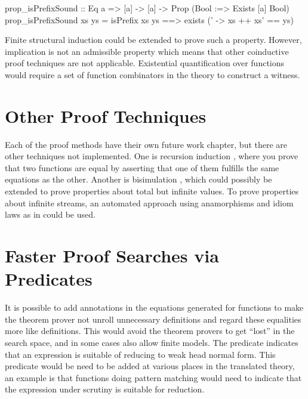 \begin{code}
prop_isPrefixSound :: Eq a => [a] -> [a] -> Prop (Bool :=> Exists [a] Bool)
prop_isPrefixSound xs ys = isPrefix xs ys ==> exists (\xs' -> xs ++ xs' == ys)
\end{code}

Finite structural induction could be extended to prove such a
property. However, implication is not an admissible property which
means that other coinductive proof techniques are not
applicable. Existential quantification over functions would require a
set of function combinators in the theory to construct a witness.

\section{Other Proof Techniques}

Each of the proof methods have their own future work chapter, but
there are other techniques not implemented. One is recursion induction
\citep{recind}, where you prove that two functions are equal by
asserting that one of them fulfills the same equations as the
other. Another is bisimulation \citep{bisimulationCapretta}, which
could possibly be extended to prove properties about total but
infinite values. To prove properties about infinite streams, an
automated approach using anamorphisms and idiom laws as in
\cite{streams} could be used.

\section{Faster Proof Searches via Predicates}
\label{sec:minpredicate}

It is possible to add annotations in the equations generated for
functions to make the theorem prover not unroll unnecessary
definitions and regard these equalities more like definitions. This
would avoid the theorem provers to get ``lost'' in the search space,
and in some cases also allow finite models. The predicate indicates
that an expression is suitable of reducing to weak head normal
form. This predicate would be need to be added at various places in
the translated theory, an example is that functions doing pattern
matching would need to indicate that the expression under scrutiny is
suitable for reduction.
